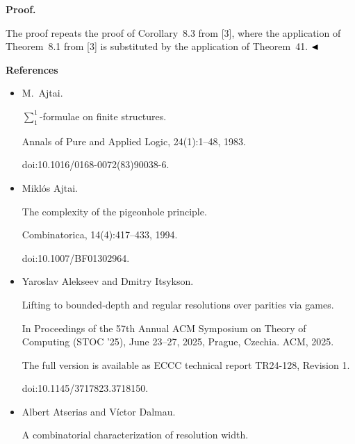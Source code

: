 \documentclass[10pt,a4paper]{article}
\begin{document}
\par\medskip\noindent\textbf{Proof.}\par


The proof repeats the proof of Corollary 8.3 from [3], where the application of Theorem 8.1 from [3] is substituted by the application of Theorem 41.
$\hfill\blacktriangleleft$\par


\par\medskip\noindent\textbf{References}\par

\begin{itemize}


\item 
[1]

M. Ajtai.


$\sum_{1}^{1}$-formulae on finite structures.


Annals of Pure and Applied Logic, 24(1):1–48, 1983.


doi:10.1016/0168-0072(83)90038-6.





\item 
[2]

Miklós Ajtai.


The complexity of the pigeonhole principle.


Combinatorica, 14(4):417–433, 1994.


doi:10.1007/BF01302964.





\item 
[3]

Yaroslav Alekseev and Dmitry Itsykson.


Lifting to bounded-depth and regular resolutions over parities via
games.


In Proceedings of the 57th Annual ACM Symposium on Theory of
Computing (STOC ’25), June 23–27, 2025, Prague, Czechia. ACM, 2025.


The full version is available as ECCC technical report TR24-128,
Revision 1.


doi:10.1145/3717823.3718150.





\item 
[4]

Albert Atserias and Víctor Dalmau.


A combinatorial characterization of resolution width.



\end{itemize}
\end{document}

